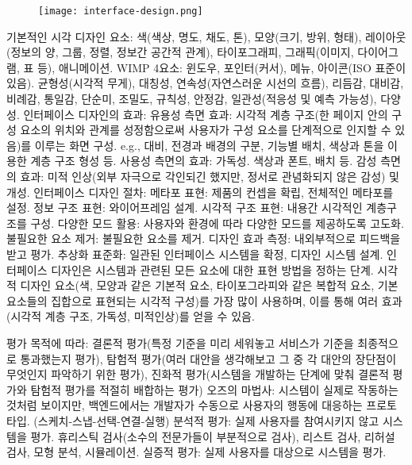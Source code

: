 
\vspace{-3mm}
\begin{figure}[h] \centering \texttt{[image: interface-design.png]} \end{figure}
\vspace{-3mm}

\bitmz
  \itm 기본적인 시각 디자인 요소: 색(색상, 명도, 채도, 톤), 모양(크기, 방위, 형태), 레이아웃(정보의 양, 그룹, 정렬, 정보간 공간적 관계), 타이포그래피, 그래픽(이미지, 다이어그램, 표 등), 애니메이션.
  \itm WIMP 4요소: 윈도우, 포인터(커서), 메뉴, 아이콘(ISO 표준이 있음).
  \itm 균형성(시각적 무게), 대칭성, 연속성(자연스러운 시선의 흐름), 리듬감, 대비감, 비례감, 통일감, 단순미, 조밀도, 규칙성, 안정감, 일관성(적응성 및 예측 가능성), 다양성.
  \itm 인터페이스 디자인의 효과:
  \bitmz
    \itm 유용성 측면 효과: 시각적 계층 구조(한 페이지 안의 구성 요소의 위치와 관계를 성정함으로써 사용자가 구성 요소를 단계적으로 인지할 수 있음)를 이루는 화면 구성. e.g., 대비, 전경과 배경의 구분, 기능별 배치, 색상과 톤을 이용한 계층 구조 형성 등.
    \itm 사용성 측면의 효과: 가독성. 색상과 폰트, 배치 등.
    \itm 감성 측면의 효과: 미적 인상(외부 자극으로 각인되긴 했지만, 정서로 관념화되지 않은 감성) 및 개성.
  \eitmz
  \itm 인터페이스 디자인 절차:
  \bitmz
    \itm 메타포 표현: 제품의 컨셉을 확립, 전체적인 메타포를 설정.
    \itm 정보 구조 표현: 와이어프레임 설계.
    \itm 시각적 구조 표현: 내용간 시각적인 계층구조를 구성.
    \itm 다양한 모드 활용: 사용자와 환경에 따라 다양한 모드를 제공하도록 고도화.
    \itm 불필요한 요소 제거: 불필요한 요소를 제거.
    \itm 디자인 효과 측정: 내외부적으로 피드백을 받고 평가.
    \itm 추상화 표준화: 일관된 인터페이스 시스템을 확정, 디자인 시스템 설계.
  \eitmz
  \itm 인터페이스 디자인은 시스템과 관련된 모든 요소에 대한 표현 방법을 정하는 단계. 시각적 디자인 요소(색, 모양과 같은 기본적 요소, 타이포그라피와 같은 복합적 요소, 기본 요소들의 집합으로 표현되는 시각적 구성)를 가장 많이 사용하며, 이를 통해 여러 효과(시각적 계층 구조, 가독성, 미적인상)를 얻을 수 있음.
\eitmz


\bitmz
  \itm 평가 목적에 따라: 결론적 평가(특정 기준을 미리 세워놓고 서비스가 기준을 최종적으로 통과했는지 평가), 탐험적 평가(여러 대안을 생각해보고 그 중 각 대안의 장단점이 무엇인지 파악하기 위한 평가), 진화적 평가(시스템을 개발하는 단계에 맞춰 결론적 평가와 탐험적 평가를 적절히 배합하는 평가)
  \itm 오즈의 마법사: 시스템이 실제로 작동하는 것처럼 보이지만, 백엔드에서는 개발자가 수동으로 사용자의 행동에 대응하는 프로토타입. (스케치-스냅-선택-연결-실행)
  \itm 분석적 평가: 실제 사용자를 참여시키지 않고 시스템을 평가. 휴리스틱 검사(소수의 전문가들이 부분적으로 검사), 리스트 검사, 리허설 검사, 모형 분석, 시뮬레이션.
  \itm 실증적 평가: 실제 사용자를 대상으로 시스템을 평가.
\eitmz
